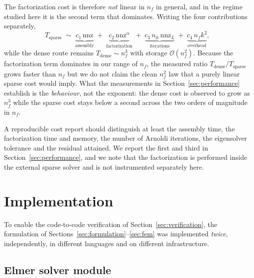 \documentclass[pdflatex,sn-mathphys-num]{sn-jnl}
\theoremstyle{thmstyleone}%
\theoremstyle{thmstyletwo}%
\theoremstyle{thmstylethree}%
\begin{document}
The factorization cost is therefore \emph{not} linear in $n_f$ in general, and
in the regime studied here it is the second term that dominates. Writing the
four contributions separately,
%
\begin{equation}\label{eq:costmodel}
  T_{\text{sparse}} \;\sim\;
  \underbrace{c_1\,\mathrm{nnz}}_{\text{assembly}}
  \;+\;
  \underbrace{c_2\,\mathrm{nnz}^{\alpha}}_{\text{factorization}}
  \;+\;
  \underbrace{c_3\,n_{\mathrm{it}}\,\mathrm{nnz}_L}_{\text{iterations}}
  \;+\;
  \underbrace{c_4\,n_f k^2}_{\text{overhead}} ,
\end{equation}
%
while the dense route remains $T_{\text{dense}} \sim n_f^3$ with storage
$\mathcal{O}(n_f^2)$. Because the factorization term dominates in our range of
$n_f$, the measured ratio $T_{\text{dense}}/T_{\text{sparse}}$ grows faster than
$n_f$ but we do not claim the clean $n_f^2$ law that a purely linear sparse cost
would imply. What the measurements in Section~\ref{sec:performance} establish is
the \emph{behaviour}, not the exponent: the dense cost is observed to grow as
$n_f^3$ while the sparse cost stays below a second across the two orders of
magnitude in $n_f$.

A reproducible cost report should distinguish at least the assembly time, the
factorization time and memory, the number of Arnoldi iterations, the eigensolver
tolerance and the residual attained. We report the first and third in
Section~\ref{sec:performance}, and we note that the factorization is performed
inside the external sparse solver and is not instrumented separately here.

\section{Implementation}\label{sec:implementation}

To enable the code-to-code verification of Section~\ref{sec:verification}, the
formulation of Sections~\ref{sec:formulation}--\ref{sec:fem} was implemented
\emph{twice}, independently, in different languages and on different
infrastructure.

\subsection{\textsf{Elmer} solver module}
\end{document}
